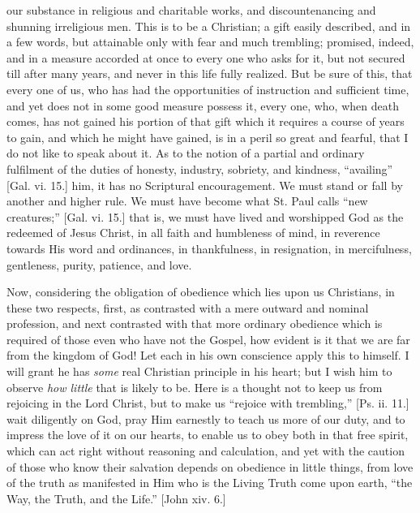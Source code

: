 our substance in religious and charitable works, and
discountenancing and shunning irreligious men. This is to
be a Christian; a gift easily described, and in a few
words, but attainable only with fear and much trembling; promised, indeed, and in a measure accorded at once to
every one who asks for it, but not secured till after
many years, and never in this life fully realized. But be
sure of this, that every one of us, who has had the
opportunities of instruction and sufficient time, and yet
does not in some good measure possess it, every one, who,
when death comes, has not gained his portion of that gift
which it requires a course of years to gain, and which he
might have gained, is in a peril so great and fearful,
that I do not like to speak about it. As to the notion of
a partial and ordinary fulfilment of the duties of
honesty, industry, sobriety, and kindness,
``availing'' [Gal. vi. 15.] him, it has no
Scriptural encouragement. We must stand or fall by
another and higher rule. We must have become what St.
Paul calls ``new creatures;'' [Gal. vi. 15.] that
is, we must have lived and worshipped God as the redeemed
of Jesus Christ, in all faith and humbleness of mind, in
reverence towards His word and ordinances, in
thankfulness, in resignation, in mercifulness,
gentleness, purity, patience, and love.

Now, considering the obligation of obedience which
lies upon us Christians, in these two respects, first, as
contrasted with a mere outward and nominal profession,
and next contrasted with that more ordinary obedience
which is required of those even who have not the Gospel,
how evident is it that we are far from the kingdom of
God! Let each in his own conscience apply this to
himself. I will grant he has \emph{some} real Christian
principle in his heart; but I wish him to observe \emph{how
little} that is likely to be. Here is a thought not
to keep us from rejoicing in the Lord Christ, but to make
us ``rejoice with trembling,'' [Ps. ii. 11.] wait
diligently on God, pray Him earnestly to teach us more of
our duty, and to impress the love of it on our hearts, to
enable us to obey both in that free spirit, which can act
right without reasoning and calculation, and yet with the
caution of those who know their salvation depends on
obedience in little things, from love of the truth as
manifested in Him who is the Living Truth come upon
earth, ``the Way, the Truth, and the Life.''
[John xiv. 6.]

